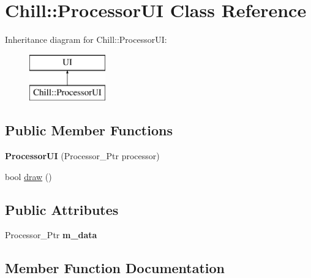 \hypertarget{class_chill_1_1_processor_u_i}{}\section{Chill\+:\+:Processor\+UI Class Reference}
\label{class_chill_1_1_processor_u_i}
Inheritance diagram for Chill\+:\+:Processor\+UI\+:\begin{figure}[H]
\begin{center}
\leavevmode
\includegraphics[height=2.000000cm]{class_chill_1_1_processor_u_i}
\end{center}
\end{figure}
\subsection*{Public Member Functions}
\begin{DoxyCompactItemize}
\item 
\mbox{\label{class_chill_1_1_processor_u_i_a07c3a7ca4d38ff9fb406a0172a61d1b3}} 
{\bfseries Processor\+UI} (Processor\+\_\+\+Ptr processor)
\item 
bool \mbox{\hyperlink{class_chill_1_1_processor_u_i_a7833bb5acc47818d6b7a320815b5beea}{draw}} ()
\end{DoxyCompactItemize}
\subsection*{Public Attributes}
\begin{DoxyCompactItemize}
\item 
\mbox{\label{class_chill_1_1_processor_u_i_a5e38c36467c511e2a3b893d02549fc84}} 
Processor\+\_\+\+Ptr {\bfseries m\+\_\+data}
\end{DoxyCompactItemize}


\subsection{Member Function Documentation}
\mbox{\label{class_chill_1_1_processor_u_i_a7833bb5acc47818d6b7a320815b5beea}} 
